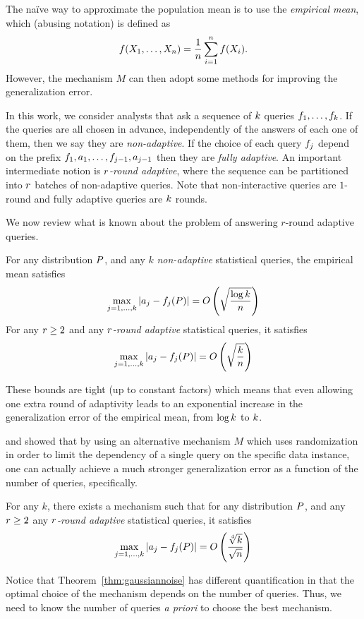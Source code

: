 The na\"ive way to approximate the population mean is to use the \emph{empirical mean}, which (abusing notation) is defined as $$f(X_1,\dots,X_n) = \frac{1}{n} \sum_{i=1}^{n} f(X_i).$$
However, the mechanism $M$ can then adopt some methods for improving the generalization error.

In this work, we consider analysts that ask a sequence of $k$ queries $f_1,\dots,f_k$.  If the queries are all chosen in advance, independently of the answers of each one of them, then we say they are \emph{non-adaptive}.  If the choice of each query $f_j$ depend on the prefix $f_1,a_1,\dots,f_{j-1},a_{j-1}$ then they are \emph{fully adaptive}.  An important intermediate notion is \emph{$r$-round adaptive}, where the sequence can be partitioned into $r$ batches of non-adaptive queries.  Note that non-interactive queries are $1$-round and fully adaptive queries are $k$ rounds.

We now review what is known about the problem of answering $r$-round adaptive queries.  
\begin{thm} 
\label{thm:nonadapt-adapt}
For any distribution $P$, and any $k$ \emph{non-adaptive} statistical queries, the empirical mean satisfies
$$
\max_{j=1,\dots,k} | a_j - f_j(P) | = O\left( \sqrt{\frac{\log k}{n}}  \right)
$$
For any $r \geq 2$ and any \emph{$r$-round adaptive} statistical queries, it satisfies
$$
\max_{j=1,\dots,k} | a_j - f_j(P) | = O\left( \sqrt{\frac{k}{n}}  \right)
$$
\end{thm}
These bounds are tight (up to constant factors) which means that even allowing one extra round of adaptivity leads to an exponential increase in the generalization error of the empirical mean, from $\log k$ to $k$.

\citet{DworkFHPRR15} and \citet{BassilyNSSSU16} showed that by using an alternative mechanism $M$ which uses randomization in order to limit the dependency of a single query on the specific data instance, one 
can actually achieve a much stronger generalization error as a function of the number of queries, specifically.
\begin{thm} \label{thm:gaussiannoise} For any $k$, there exists a mechanism such that for any distribution $P$, and any $r \geq 2$ any \emph{$r$-round adaptive} statistical queries, it satisfies
$$
\max_{j=1,\dots,k} | a_j - f_j(P) | = O\left( \frac{\sqrt[4]{k}}{\sqrt{n}}  \right)
$$
\end{thm}
Notice that Theorem~\ref{thm:gaussiannoise} has different quantification in that the optimal choice of the mechanism depends on the number of queries.  Thus, we need to know the number of queries \emph{a priori} to choose the best mechanism.


